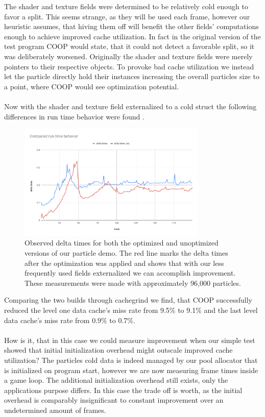 The shader and texture fields were determined to be relatively cold enough to favor a split. This seems strange, as they will be used each frame, however our heuristic assumes, that hiving them off will benefit the other fields' computations enough to achieve improved cache utilization. In fact in the original version of the test program COOP would state, that it could not detect a favorable split, so it was deliberately worsened. Originally the shader and texture fields were merely pointers to their respective objects. To provoke bad cache utilization we instead let the particle directly hold their instances increasing the overall particles size to a point, where COOP would see optimization potential.\\\\
Now with the shader and texture field externalized to a cold struct the following differences in run time behavior were found .
\begin{figure}[!htbp]
	\centering
	\includegraphics[width=0.8\textwidth,height=0.6\textwidth]{PICs/delta_times}
	\caption{Observed delta times for both the optimized and unoptimized versions of our particle demo. The red line marks the delta times after the optimization was applied and shows that with our less frequently used fields externalized we can accomplish improvement. These measurements were made with approximately 96,000 particles.}
	\label{delta_times}
\end{figure}
Comparing the two builds through cachegrind we find, that COOP successfully reduced the level one data cache's miss rate from 9.5\% to 9.1\% and the last level data cache's miss rate from 0.9\% to 0.7\%.\\\\
How is it, that in this case we could measure improvement when our simple test showed that initial initialization overhead might outscale improved cache utilization? The particles cold data is indeed managed by our pool allocator that is initialized on program start, however we are now measuring frame times inside a game loop. The additional initialization overhead still exists, only the applications purpose differs. In this case the trade off is worth, as the initial overhead is comparably insignificant to constant improvement over an undetermined amount of frames.\\\\
